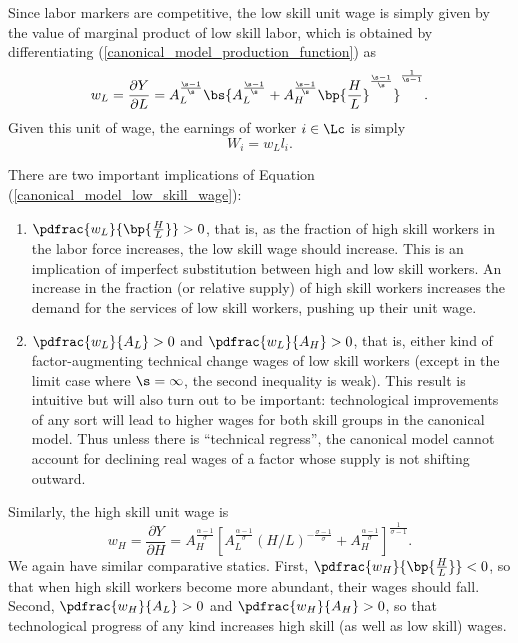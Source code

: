 \documentclass[12pt]{article}
\newcommand{\highlightP}[1]{{\emph{\color{MyPink}{#1}}}}
\theoremstyle{definition}
\begin{document}
Since labor markers are competitive, the low skill unit wage is simply given by the value of marginal product of low skill labor, which is obtained by differentiating (\ref{canonical_model_production_function}) as 
\begin{equation}
    \label{canonical_model_low_skill_wage}
    w_L = \frac{\partial Y}{\partial L} = A_L^{\frac{\s - 1}{\s}} \bs{A_L^{\frac{\s - 1}{\s}} + A_H^{\frac{\s - 1}{\s}} \bp{\frac{H}{L}}^{\frac{\s - 1}{\s}} }^{\frac{1}{\s - 1}}.
\end{equation}
Given this unit of wage, the earnings of worker $i \in \Lc$ is simply 
$$W_i = w_L l_i .$$

There are two important implications of Equation (\ref{canonical_model_low_skill_wage}):
\begin{enumerate}[topsep=0pt, leftmargin=20pt, itemsep=0pt, label=(\arabic*)]
\setlength{\parskip}{10pt} 
\item $\pdfrac{w_L}{\bp{\frac{H}{L}}} > 0$, that is, as the fraction of high skill workers in the labor force increases, the low skill wage should increase. This is an implication of imperfect substitution between high and low skill workers. An increase in the fraction (or relative supply) of high skill workers increases the demand for the services of low skill workers, pushing up their unit wage.
\item $\pdfrac{w_L}{A_L} > 0$ and $\pdfrac{w_L}{A_H} > 0$, that is, either kind of factor-augmenting technical change \highlightP{increases} wages of low skill workers (except in the limit case where $\s = \infty$, the second inequality is weak). This result is intuitive but will also turn out to be important: technological improvements of any sort will lead to higher wages for both skill groups in the canonical model. Thus unless there is ``technical regress'', the canonical model cannot account for declining real wages of a factor whose supply is not shifting outward.
\end{enumerate}

Similarly, the high skill unit wage is
\begin{equation}
    \label{canonical_model_high_sill_wage}
    w_H=\frac{\partial Y}{\partial H}=A_H^{\frac{\alpha-1}{\sigma}}\left[A_L^{\frac{\alpha-1}{\sigma}}(H / L)^{-\frac{\sigma-1}{\sigma}}+A_H^{\frac{\alpha-1}{\sigma}}\right]^{\frac{1}{\sigma-1}} .
\end{equation}
We again have similar comparative statics. First, $\pdfrac{w_H}{\bp{\frac{H}{L}}} < 0$, so that when high skill workers become more abundant, their wages should fall. Second, $\pdfrac{w_H}{A_L} > 0$ and $\pdfrac{w_H}{A_H} > 0$, so that technological progress of any kind increases high skill (as well as low skill) wages.
\end{document}
